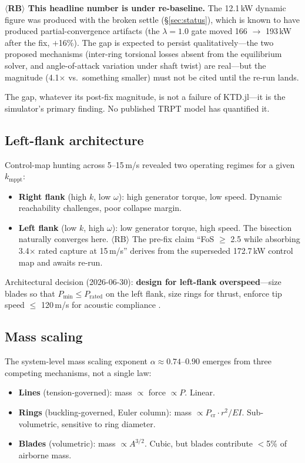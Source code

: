 \documentclass[11pt,a4paper]{article}
\newcommand{\RB}{$\langle$RB$\rangle$}  %
\begin{document}
\textbf{\RB{} This headline number is under re-baseline.}
The 12.1\,kW dynamic figure was produced with the broken settle (\S\ref{sec:status}),
which is known to have produced partial-convergence artifacts
(the $\lambda = 1.0$ gate moved 166 $\rightarrow$ 193\,kW after the fix, $+$16\%).
The gap is expected to persist qualitatively---the two proposed mechanisms
(inter-ring torsional losses absent from the equilibrium solver, and angle-of-attack
variation under shaft twist) are real---but the magnitude (4.1$\times$ vs.\ something smaller)
must not be cited until the re-run lands.

The gap, whatever its post-fix magnitude, is not a failure of KTD.jl---it is the simulator's
primary finding. No published TRPT model has quantified it.

\subsection{Left-flank architecture}

Control-map hunting across 5--15\,m/s revealed two operating regimes for a given $k_{\text{mppt}}$:

\begin{itemize}
\item \textbf{Right flank} (high $k$, low $\omega$): high generator torque, low speed.
      Dynamic reachability challenges, poor collapse margin.
\item \textbf{Left flank} (low $k$, high $\omega$): low generator torque, high speed.
      The bisection naturally converges here.
      \RB{} The pre-fix claim ``FoS $\geq$ 2.5 while absorbing 3.4$\times$ rated capture
      at 15\,m/s'' derives from the superseded 172.7\,kW control map and awaits re-run.
\end{itemize}

Architectural decision (2026-06-30): \textbf{design for left-flank overspeed}---size blades
so that $P_{\text{min}} \leq P_{\text{rated}}$ on the left flank, size rings for thrust,
enforce tip speed $\leq$ 120\,m/s for acoustic compliance \cite{ktd_decisions2026}.

\subsection{Mass scaling}

The system-level mass scaling exponent $\alpha \approx 0.74$--$0.90$ emerges from three
competing mechanisms, not a single law:

\begin{itemize}
\item \textbf{Lines} (tension-governed): mass $\propto$ force $\propto P$. Linear.
\item \textbf{Rings} (buckling-governed, Euler column): mass $\propto P_{\text{cr}} \cdot r^2 / EI$.
      Sub-volumetric, sensitive to ring diameter.
\item \textbf{Blades} (volumetric): mass $\propto A^{3/2}$. Cubic, but blades contribute
      $<$5\% of airborne mass.
\end{itemize}
\end{document}

